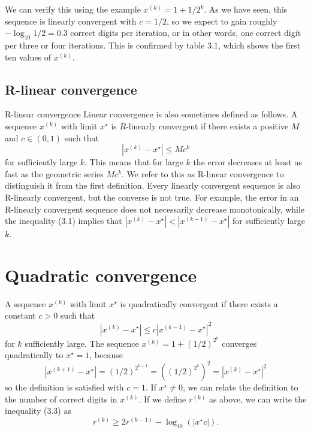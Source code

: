 We can verify this using the example $ x^{(k)}=1+1 / 2^{k} $. As we have seen, this sequence is linearly convergent with $ c=1 / 2 $, so we expect to gain roughly $ -\log _{10} 1 / 2=0.3 $ correct digits per iteration, or in other words, one correct digit per three or four iterations. This is confirmed by table $ 3.1 $, which shows the first ten values of $ x^{(k)} $.

\subsection{R-linear convergence}

R-linear convergence Linear convergence is also sometimes defined as follows. A sequence $ x^{(k)} $ with limit $ x^{\star} $ is $ R $-linearly convergent if there exists a positive $ M $ and $ c \in(0,1) $ such that
\begin{equation}
\left|x^{(k)}-x^{\star}\right| \leq M c^{k}
\end{equation}
for sufficiently large $ k $. This means that for large $ k $ the error decreases at least as fast as the geometric series $ M c^{k} $. We refer to this as R-linear convergence to distinguish it from the first definition. Every linearly convergent sequence is also R-linearly convergent, but the converse is not true. For example, the error in an R-linearly convergent sequence does not necessarily decrease monotonically, while the inequality (3.1) implies that $ \left|x^{(k)}-x^{\star}\right|<\left|x^{(k-1)}-x^{\star}\right| $ for sufficiently large $ k $.

\section{Quadratic convergence}

A sequence $ x^{(k)} $ with limit $ x^{\star} $ is quadratically convergent if there exists a constant $ c>0 $ such that
\begin{equation}
\left|x^{(k)}-x^{\star}\right| \leq c\left|x^{(k-1)}-x^{\star}\right|^{2}
\end{equation}
for $ k $ sufficiently large. The sequence $ x^{(k)}=1+(1 / 2)^{2^{k}} $ converges quadratically to $ x^{\star}=1 $, because
\begin{equation}
\left|x^{(k+1)}-x^{\star}\right|=(1 / 2)^{2^{k+1}}=\left((1 / 2)^{2^{k}}\right)^{2}=\left|x^{(k)}-x^{\star}\right|^{2}
\end{equation}
so the definition is satisfied with $ c=1 $.
If $ x^{\star} \neq 0 $, we can relate the definition to the number of correct digits in $ x^{(k)} $. If we define $ r^{(k)} $ as above, we can write the inequality (3.3) as
\begin{equation}
r^{(k)} \geq 2 r^{(k-1)}-\log _{10}\left(\left|x^{\star} c\right|\right) .
\end{equation}

